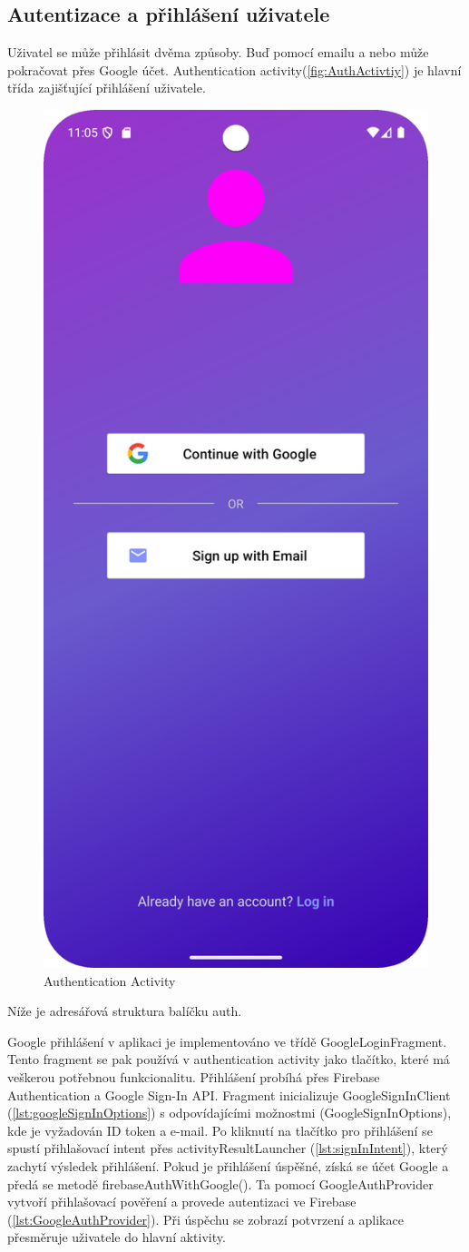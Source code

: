 \subsection{Autentizace a přihlášení uživatele}
\hspace{14pt} Uživatel se může přihlásit dvěma způsoby. Buď pomocí emailu a nebo může pokračovat přes Google účet. Authentication activity(\autoref{fig:AuthActivtiy}) je hlavní třída zajišťující přihlášení uživatele. 
\\ 
\begin{figure}[H]
    \centering
    \includegraphics[width=0.4\linewidth]{images/auth.png}
    \caption{Authentication Activity}
    \label{fig:AuthActivtiy}
\end{figure}
Níže je adresářová struktura balíčku auth.
\\

\newpage

Google přihlášení v aplikaci je implementováno ve třídě GoogleLoginFragment. Tento fragment se pak používá v authentication activity jako tlačítko, které má veškerou potřebnou funkcionalitu.  Přihlášení probíhá přes Firebase Authentication a Google Sign-In API. Fragment inicializuje GoogleSignInClient (\autoref{lst:googleSignInOptions}) s odpovídajícími možnostmi (GoogleSignInOptions), kde je vyžadován ID token a e-mail. Po kliknutí na tlačítko pro přihlášení se spustí přihlašovací intent přes activityResultLauncher (\autoref{lst:signInIntent}), který zachytí výsledek přihlášení. Pokud je přihlášení úspěšné, získá se účet Google a předá se metodě firebaseAuthWithGoogle(). Ta pomocí GoogleAuthProvider vytvoří přihlašovací pověření a provede autentizaci ve Firebase (\autoref{lst:GoogleAuthProvider}). Při úspěchu se zobrazí potvrzení a aplikace přesměruje uživatele do hlavní aktivity.


